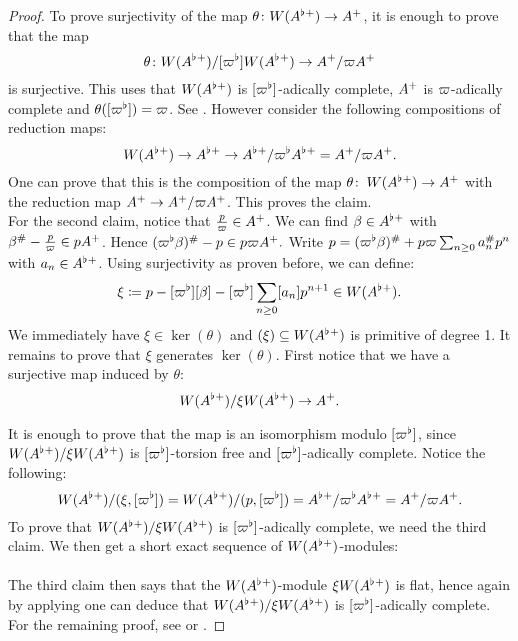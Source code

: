 \begin{proof}
To prove surjectivity of the map $\theta\colon W(A^{\flat}{^{+}})\to A{^{+}}$, it is enough to prove that the map
\[\theta\colon W(A^{\flat}{^{+}})/[\varpi^{\flat}]W(A^{\flat}{^{+}}) \to A{^{+}}/\varpi A{^{+}}\]
is surjective. This uses that $W(A^{\flat}{^{+}})$ is $[\varpi^{\flat}]$-adically complete, $A{^{+}}$ is $\varpi$-adically complete and $\theta([\varpi^{\flat}])=\varpi$. See \cite[{Tag 0315}]{stacks-project}.
However consider the following compositions of reduction maps:
\[W(A^{\flat}{^{+}})\to A^{\flat}{^{+}}\to A^{\flat}{^{+}}/\varpi^{\flat} A^{\flat}{^{+}} = A{^{+}}/\varpi A{^{+}}.\]
One can prove that this is the composition of the map $\theta\colon\: W(A^{\flat}{^{+}})\to A{^{+}}$ with the reduction map $ A{^{+}}\to A{^{+}}/\varpi A{^{+}}$.
This proves the claim.\\
For the second claim, notice that $\frac{p}{\varpi}\in A{^{+}}$.
We can find $\beta\in A^{\flat}{^{+}}$ with $\beta^{\#}-\frac{p}{\varpi}\in pA{^{+}}$.
Hence
$(\varpi^{\flat}\beta)^{\#}-p\in p\varpi A{^{+}}.$
Write
$p = (\varpi^{\flat}\beta)^{\#} +p\varpi\sum_{n\geq0}a_n^{\#} p^n$ with $a_n\in A^{\flat}{^{+}}$.
Using surjectivity as proven before, we can define:
\[\xi\coloneqq p-[\varpi^{\flat}][\beta] - [\varpi^{\flat}]\sum_{n\geq0}[a_n]p^{n+1}\in W(A^{\flat}{^{+}}).\]
We immediately have $\xi\in\ker(\theta)$ and $(\xi)\subseteq W(A^{\flat}{^{+}})$ is primitive of degree 1. 
It remains to prove that $\xi$ generates $\ker(\theta)$.
First notice that we have a surjective map induced by $\theta$:
\[W(A^{\flat}{^{+}})/\xi W(A^{\flat}{^{+}})\to A{^{+}}.\]

It is enough to prove that the map is an isomorphism modulo $[\varpi^{\flat}]$, since $W(A^{\flat}{^{+}})/\xi W(A^{\flat}{^{+}})$
is $[\varpi^{\flat}]$-torsion free and $[\varpi^{\flat}]$-adically complete.
Notice the following:
\[W(A^{\flat}{^{+}})/(\xi,[\varpi^{\flat}]) = W(A^{\flat}{^{+}})/(p,[\varpi^{\flat}]) = A^{\flat}{^{+}}/\varpi^{\flat} A^{\flat}{^{+}} = A{^{+}}/\varpi A{^{+}}.\]
To prove that $W(A^{\flat}{^{+}})/\xi W(A^{\flat}{^{+}})$ is $[\varpi^{\flat}]$-adically complete, we need the third claim. We then get a short exact sequence of
$W(A^{\flat}{^{+}})$-modules:\\

\\

The third claim then says that the $W(A^{\flat}{^{+}})$-module $\xi W(A^{\flat}{^{+}})$ is flat, hence again by applying \cite[{Tag 0315}]{stacks-project}
one can deduce that $W(A^{\flat}{^{+}})/\xi W(A^{\flat}{^{+}})$ is $[\varpi^{\flat}]$-adically complete. For the remaining proof, see \cite[lemma V.1.4.2]{Morel19} or \cite[lemma 3.16]{Scholzeetcoh21}.
\end{proof}



